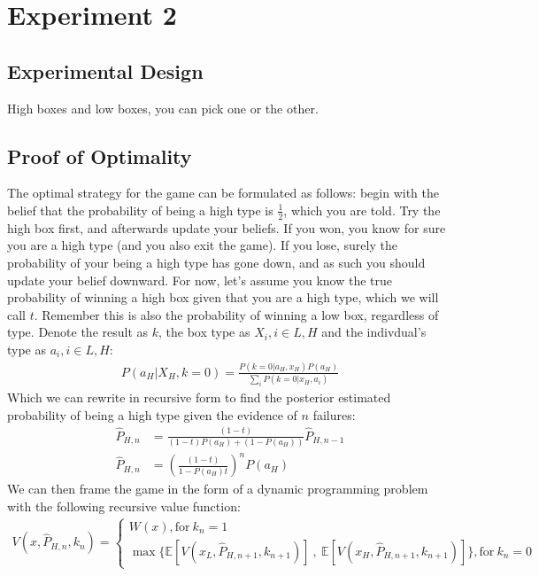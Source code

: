 \documentclass[a4paper,12pt]{article}
\begin{document}
\section{ Experiment 2 }

\subsection{ Experimental Design }

High boxes and low boxes, you can pick one or the other.

\subsection{ Proof of Optimality }

The optimal strategy for the game can be formulated as follows: begin with the belief that the probability of being a high type is $\frac{1}{2}$, which you are told. Try the high box first, and afterwards update your beliefs. If you won, you know for sure you are a high type (and you also exit the game). If you lose, surely the probability of your being a high type has gone down, and as such you should update your belief downward. For now, let's assume you know the true probability of winning a high box given that you are a high type, which we will call $t$. Remember this is also the probability of winning a low box, regardless of type. Denote the result as $k$, the box type as $X_i, i \in {L, H}$ and the indivdual's type as $a_i, i \in {L, H}$:
%
\begin{align*}
  P(a_H | X_H, k = 0) = \frac{ P(k = 0 | a_H, x_H) P(a_H)}{ \sum_i P(k = 0 | x_H, a_i) }
\end{align*}
Which we can rewrite in recursive form to find the posterior estimated probability of being a high type given the evidence of $n$ failures:
\begin{align*}
  \hat{P}_{H,n} &= \frac{(1 - t) }{ (1-t)P(a_H) + (1 - P(a_H)) } \hat{P}_{H, n -1 } \\
  \hat{P}_{H,n} &= \left( \frac{(1 - t) }{ 1 - P(a_H)t } \right)^n P(a_H)
\end{align*}
%
We can then frame the game in the form of a dynamic programming problem with the following recursive value function:
\begin{align*}
  V(x, \hat{P}_{H,n}, k_n) =
 \begin{cases} W(x), \text{for} \ k_n = 1 \\
    \max \bigg\{ \mathbb{E}[V(x_L, \hat{P}_{H,n+1}, k_{n+1})] \ , \ \mathbb{E}[V(x_H, \hat{P}_{H,n+1}, k_{n+1})]  \bigg\}, \text{for} \ k_n = 0
\end{cases}
\end{align*}
\end{document}
